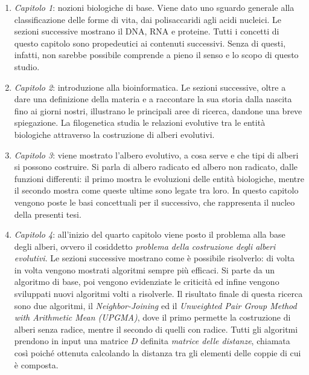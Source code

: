 \begin{enumerate}
	\item \textit{Capitolo 1}: nozioni biologiche di base. Viene dato uno sguardo generale alla classificazione delle forme di vita, dai polisaccaridi agli acidi nucleici. Le sezioni successive mostrano il DNA, RNA e proteine. Tutti i concetti di questo capitolo sono propedeutici ai contenuti successivi. Senza di questi, infatti, non sarebbe possibile comprende a pieno il senso e lo scopo di questo studio.
	\item \textit{Capitolo 2}: introduzione alla bioinformatica. Le sezioni successive, oltre a dare una definizione della materia e a raccontare la sua storia dalla nascita fino ai giorni nostri, illustrano le principali aree di ricerca, dandone una breve spiegazione.
	\newline
	La filogenetica studia le relazioni evolutive tra le entità biologiche attraverso la costruzione di alberi evolutivi.
	\item \textit{Capitolo 3}: viene mostrato l'albero evolutivo, a cosa serve e che tipi di alberi si possono costruire. Si parla di albero radicato ed albero non radicato, dalle funzioni differenti: il primo mostra le evoluzioni delle entità biologiche, mentre il secondo mostra come queste ultime sono legate tra loro. In questo capitolo vengono poste le basi concettuali per il successivo, che rappresenta il nucleo della presenti tesi.
	\item \textit{Capitolo 4}: all'inizio del quarto capitolo viene posto il problema alla base degli alberi, ovvero il cosiddetto \textit{problema della costruzione degli alberi evolutivi}. Le sezioni successive mostrano come è possibile risolverlo: di volta in volta vengono mostrati algoritmi sempre più efficaci. Si parte da un algoritmo di base, poi vengono evidenziate le criticità ed infine vengono sviluppati nuovi algoritmi volti a risolverle. Il risultato finale di questa ricerca sono due algoritmi, il \textit{Neighbor-Joining} ed il \textit{Unweighted Pair Group Method with Arithmetic Mean (UPGMA)}, dove il primo permette la costruzione di alberi senza radice, mentre il secondo di quelli con radice.
	\newline
	Tutti gli algoritmi prendono in input una matrice $D$ definita \textit{matrice delle distanze}, chiamata così poiché ottenuta calcolando la distanza tra gli elementi delle coppie di cui è composta.
\end{enumerate}

